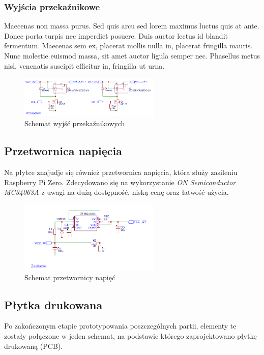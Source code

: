\documentclass[12pt, eng, twoside, openany, final]{mgr}
\begin{document}
            \subsubsection{Wyjścia przekaźnikowe}
            Maecenas non massa purus. Sed quis arcu sed lorem maximus luctus quis at ante. Donec porta turpis nec imperdiet posuere. Duis auctor lectus id blandit fermentum. Maecenas sem ex, placerat mollis nulla in, placerat fringilla mauris. Nunc molestie euismod massa, sit amet auctor ligula semper nec. Phasellus metus nisl, venenatis suscipit efficitur in, fringilla ut urna. 
                \begin{figure}[H]
                \begin{center}
                    \includegraphics[width=0.6\textwidth]{przekazniki.png}
                    \caption{Schemat wyjść przekaźnikowych}
                \end{center}
                \end{figure}
        \subsection{Przetwornica napięcia}
        Na płytce znajudje się również przetwornica napięcia, która służy zasileniu Raspberry Pi Zero. Zdecydowano się na wykorzystanie \emph{ON Semiconductor MC34063A} z uwagi na dużą dostępność, niską cenę oraz łatwość użycia. 
                \begin{figure}[H]
                \begin{center}
                    \includegraphics[width=0.6\textwidth]{psu.png}
                    \caption{Schemat przetwornicy napięć}
                \end{center}
                \end{figure}
        \subsection{Płytka drukowana}
            Po zakończonym etapie prototypowania poszczególnych partii, elementy te zostały połączone w jeden schemat, na podstawie którego zaprojektowano płytkę drukowaną (PCB). 
\end{document}
